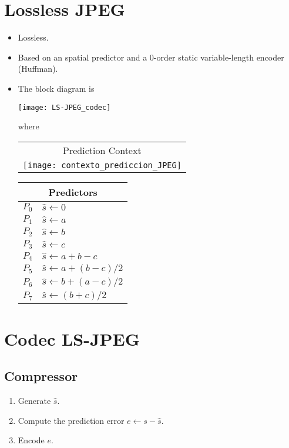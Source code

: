 \section{Lossless JPEG \cite{JPEG-LS}}
\label{sec:LS-JPEG}
\begin{itemize}
\item Lossless.
\item Based on an spatial predictor and a 0-order static
  variable-length encoder (Huffman).
\item The block diagram is
  \begin{center}
    \texttt{[image: LS-JPEG\_codec]}
  \end{center}
  where
  \begin{center}
    \begin{tabular}{c}
      Prediction Context \\
      \texttt{[image: contexto\_prediccion\_JPEG]}
    \end{tabular}
    \vspace{3ex}
    \begin{tabular}{|r|l|}
      \multicolumn{2}{c}{Predictors}\\
      \hline
      $P_0$ & $\hat{s}\leftarrow 0$\\
      $P_1$ & $\hat{s}\leftarrow a$\\
      $P_2$ & $\hat{s}\leftarrow b$\\
      $P_3$ & $\hat{s}\leftarrow c$\\
      $P_4$ & $\hat{s}\leftarrow a+b-c$\\
      $P_5$ & $\hat{s}\leftarrow a+(b-c)/2$\\
      $P_6$ & $\hat{s}\leftarrow b+(a-c)/2$\\
      $P_7$ & $\hat{s}\leftarrow (b+c)/2$\\
      \hline
    \end{tabular}
  \end{center}
\end{itemize}

\section{Codec LS-JPEG}
\subsection{Compressor}
\begin{enumerate}
\item Generate $\hat{s}$.
\item Compute the prediction error $e\leftarrow s - \hat{s}$.
\item Encode $e$.
\end{enumerate}
    
